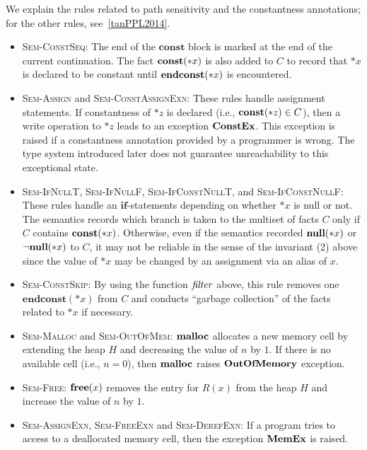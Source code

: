 We explain the rules related to path sensitivity and the constantness
annotations; for the other rules, see~\ref{tanPPL2014}.
\begin{itemize}
\item \textsc{Sem-ConstSeq}: The end of the $\mathbf{const}$ block is
      marked at the end of the current continuation.  The fact
      $\mathbf{const}(*x)$ is also added to $C$ to record that $*x$ is declared
      to be constant until $\mathbf{endconst}(*x)$ is encountered.
\item \textsc{Sem-Assign} and \textsc{Sem-ConstAssignExn}: These rules
      handle assignment statements.  If constantness of $*z$ is declared
      (i.e., $\mathbf{const}(*z) \in C$), then a write operation to $*z$ leads
      to an exception $\mathbf{ConstEx}$.  This exception is raised if a
      constantness annotation provided by a programmer is wrong.  The
      type system introduced later does not guarantee unreachability to
      this exceptional state.
\item \textsc{Sem-IfNullT}, \textsc{Sem-IfNullF},
      \textsc{Sem-IfConstNullT}, and \textsc{Sem-IfConstNullF}: These
      rules handle an $\mathbf{if}$-statements depending on whether $*x$
      is null or not.  The semantics records which branch is taken to
      the multiset of facts $C$ only if $C$ contains $\mathbf{const}(*x)$.
      Otherwise, even if the semantics recorded $\mathbf{null}(*x)$ or
      $\neg\mathbf{null}(*x)$ to $C$, it may not be reliable in the sense of the
      invariant (2) above since the value of $*x$ may be changed by an
      assignment via an alias of $x$.
\item \textsc{Sem-ConstSkip}: By using the function $\mathit{filter}$ above,
      this rule removes one $\mathbf{endconst}(*x)$ from $C$ and
      conducts ``garbage collection'' of the facts related to $*x$ if
      necessary.
\item \textsc{Sem-Malloc} and \textsc{Sem-OutOfMem}: $\mathbf{malloc}$ allocates
      a new memory cell by extending the heap $H$ and decreasing the
      value of $n$ by $1$.  If there is no available cell (i.e., $n =
      0$), then $\mathbf{malloc}$ raises $\mathbf{OutOfMemory}$ exception.
\item \textsc{Sem-Free}: $\mathbf{free}(x)$ removes the entry for $R(x)$ from
      the heap $H$ and increase the value of $n$ by $1$.
\item \textsc{Sem-AssignExn}, \textsc{Sem-FreeExn} and
      \textsc{Sem-DerefExn}: If a program tries to access to a
      deallocated memory cell, then the exception $\mathbf{MemEx}$ is raised.
\end{itemize}

